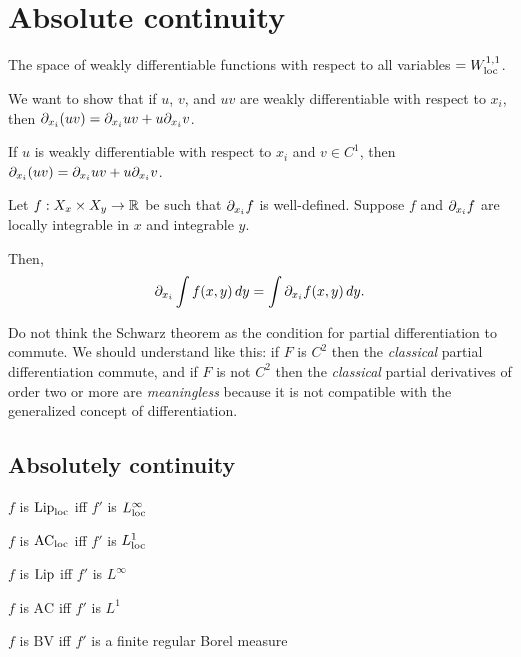 \documentclass{../../large}
\begin{document}
\chapter{Absolute continuity}

The space of weakly differentiable functions with respect to all variables $=W_{\mathrm{loc}}^{1,1}$.

\begin{prb}
We want to show that if $u$, $v$, and $uv$ are weakly differentiable with respect to $x_i$, then $\pd_{x_i}(uv)=\pd_{x_i}uv+u\pd_{x_i}v$.
\begin{parts}
\item If $u$ is weakly differentiable with respect to $x_i$ and $v\in C^1$, then $\pd_{x_i}(uv)=\pd_{x_i}uv+u\pd_{x_i}v$.
\end{parts}
\end{prb}


\begin{prb}
Let $f:X_x\times X_y\to\mathbb{R}$ be such that $\pd_{x_i}f$ is well-defined. Suppose $f$ and $\pd_{x_i}f$ are locally integrable in $x$ and integrable $y$.

Then,
\[\pd_{x_i}\int f(x,y)\,dy=\int\pd_{x_i}f(x,y)\,dy.\]
\end{prb}


Do not think the Schwarz theorem as the condition for partial differentiation to commute.
We should understand like this: if $F$ is $C^2$ then the \emph{classical} partial differentiation commute, and if $F$ is not $C^2$ then the \emph{classical} partial derivatives of order two or more are \emph{meaningless} because it is not compatible with the generalized concept of differentiation.



\section{Absolutely continuity}

\begin{parts}
\item $f$ is $\operatorname{Lip}_{\mathrm{loc}}$ iff $f'$ is $L_{\mathrm{loc}}^\infty$
\item $f$ is $\textrm{AC}_{\mathrm{loc}}$ iff $f'$ is $L_{\mathrm{loc}}^1$
\end{parts}
\begin{parts}
\item $f$ is $\operatorname{Lip}$ iff $f'$ is $L^\infty$
\item $f$ is $\textrm{AC}$ iff $f'$ is $L^1$
\item $f$ is $\textrm{BV}$ iff $f'$ is a finite regular Borel measure
\end{parts}
\end{document}
